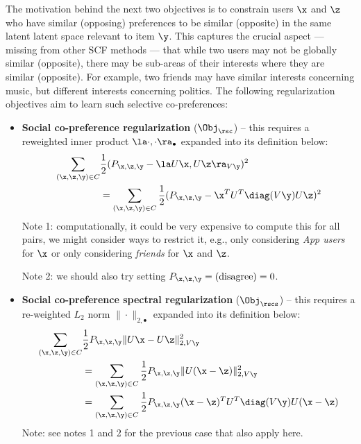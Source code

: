 The motivation behind the next two objectives is to constrain users $\x$
and $\z$ who have similar (opposing) 
preferences to be similar (opposite) in the same latent latent space
relevant to item $\y$.  This captures the crucial aspect --- missing from 
other SCF methods --- that while two users may not be globally similar (opposite),
there may be sub-areas of their interests where they are similar (opposite).
For example, two friends may have similar interests concerning music, but 
different interests concerning politics.  The following regularization objectives
aim to learn such selective co-preferences:
\begin{itemize}
\item {\bf Social co-preference regularization} ($\Obj_\rsc$)
-- this requires a reweighted inner product $\la \cdot, \cdot \ra_{\bullet}$
expanded into its definition below:
\begin{align}
\sum_{(\x,\z,\y) \in C} & \frac{1}{2} (P_{\x,\z,\y} - \la U\x, U\z \ra_{V\y})^2 \nonumber \\
& = \sum_{(\x,\z,\y) \in C} \frac{1}{2} (P_{\x,\z,\y} - \x^T U^T \diag(V\y) U \z)^2
\end{align}
\subfive Note 1: computationally, it could be very expensive to compute this
for all pairs, we might consider ways to restrict it, e.g., only considering
\emph{App users} for $\x$ or only considering \emph{friends} for $\x$ and $\z$.

\subfive Note 2: we should also try setting $P_{\x,\z,\y} = \mbox{(disagree)} = 0$.
\item {\bf Social co-preference spectral regularization}
($\Obj_\rscs$) -- this requires a re-weighted $L_2$ norm 
$\| \cdot \|_{2,\bullet}$ expanded into its definition below:
\begin{align}
\sum_{(\x,\z,\y) \in C} & \frac{1}{2} P_{\x,\z,\y} \| U\x - U\z \|_{2,V\y}^2 \nonumber \\
& = \sum_{(\x,\z,\y) \in C} \frac{1}{2} P_{\x,\z,\y} \| U (\x - \z) \|_{2,V\y}^2 \nonumber \\
& = \sum_{(\x,\z,\y) \in C} \frac{1}{2} P_{\x,\z,\y} (\x - \z)^T U^T \diag(V\y) U (\x - \z)
\end{align}
\subfive Note: see notes 1 and 2 for the previous case that also apply here.
\end{itemize}

